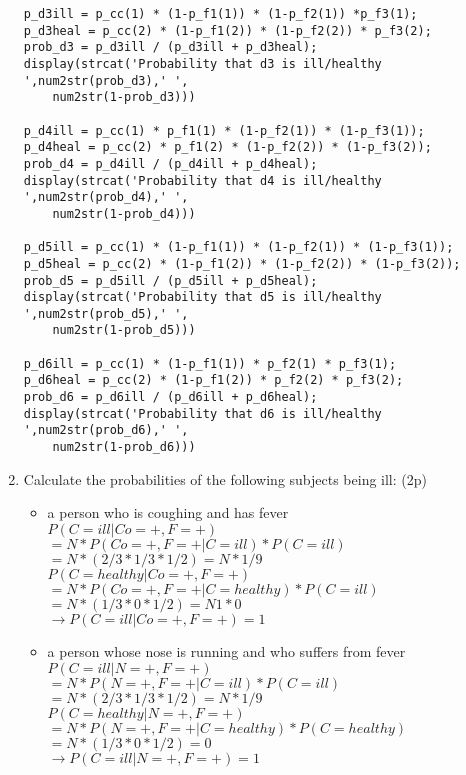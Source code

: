 \documentclass{article}
\begin{document}
\begin{enumerate}
\begin{verbatim}
p_d3ill = p_cc(1) * (1-p_f1(1)) * (1-p_f2(1)) *p_f3(1);
p_d3heal = p_cc(2) * (1-p_f1(2)) * (1-p_f2(2)) * p_f3(2);
prob_d3 = p_d3ill / (p_d3ill + p_d3heal);
display(strcat('Probability that d3 is ill/healthy ',num2str(prob_d3),' ',
    num2str(1-prob_d3)))

p_d4ill = p_cc(1) * p_f1(1) * (1-p_f2(1)) * (1-p_f3(1));
p_d4heal = p_cc(2) * p_f1(2) * (1-p_f2(2)) * (1-p_f3(2));
prob_d4 = p_d4ill / (p_d4ill + p_d4heal);
display(strcat('Probability that d4 is ill/healthy ',num2str(prob_d4),' ',
    num2str(1-prob_d4)))

p_d5ill = p_cc(1) * (1-p_f1(1)) * (1-p_f2(1)) * (1-p_f3(1));
p_d5heal = p_cc(2) * (1-p_f1(2)) * (1-p_f2(2)) * (1-p_f3(2));
prob_d5 = p_d5ill / (p_d5ill + p_d5heal);
display(strcat('Probability that d5 is ill/healthy ',num2str(prob_d5),' ',
    num2str(1-prob_d5)))

p_d6ill = p_cc(1) * (1-p_f1(1)) * p_f2(1) * p_f3(1);
p_d6heal = p_cc(2) * (1-p_f1(2)) * p_f2(2) * p_f3(2);
prob_d6 = p_d6ill / (p_d6ill + p_d6heal);
display(strcat('Probability that d6 is ill/healthy ',num2str(prob_d6),' ',
    num2str(1-prob_d6)))
   \end{verbatim} \newpage
 \item Calculate the probabilities of the following subjects being ill: (2p)
    \begin{itemize}
    \item a person who is coughing and has fever \\
        $P(C = ill | Co = + , F = +) $ \\ $= N * P (Co = + , F = + | C = ill)*P(C = ill)$ \\ $= N*(2/3 * 1/3 * 1/2) = N*1/9$ \\
        $P(C = healthy | Co = + , F = +) $ \\ $= N * P (Co = + , F = + | C = healthy)*P(C = ill)$ \\ $= N*(1/3 * 0 * 1/2) = N1*0$ \\
        $\to P(C = ill | Co = + , F = +) = 1 $

    \item a person whose nose is running and who suffers from fever \\
        $P(C = ill | N = + , F = +) $ \\ $= N * P (N = + , F = + | C = ill)*P(C = ill)$ \\ $= N*(2/3 * 1/3 * 1/2) = N*1/9$ \\
        $P(C = healthy | N = + , F = +) $ \\ $= N * P (N = + , F = + | C = healthy)*P(C = healthy)$ \\ $= N*(1/3 * 0 * 1/2) = 0$\\
        $\to P(C = ill | N = + , F = +) = 1 $


\end{itemize}
\end{enumerate}
\end{document}
